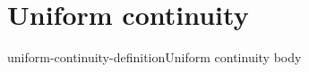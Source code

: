 \documentclass[preview]{standalone}
\begin{document}
\genpage

\section{Uniform continuity}

\begin{snippetdefinition}{uniform-continuity-definition}{Uniform continuity}
    body
\end{snippetdefinition}
\end{document}
